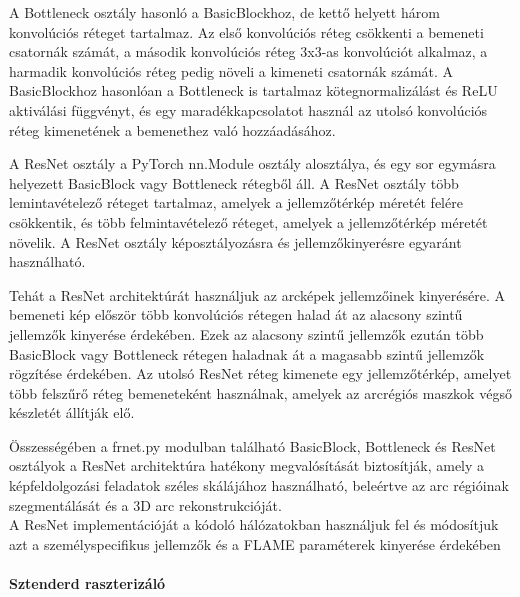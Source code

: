 \documentclass[12pt,a4]{article}
\begin{document}
            A Bottleneck osztály hasonló a BasicBlockhoz, de kettő helyett három konvolúciós réteget tartalmaz.
            Az első konvolúciós réteg csökkenti a bemeneti csatornák számát, a második konvolúciós réteg 3x3-as konvolúciót alkalmaz, a harmadik konvolúciós réteg pedig növeli a kimeneti csatornák számát.
            A BasicBlockhoz hasonlóan a Bottleneck is tartalmaz kötegnormalizálást és ReLU aktiválási függvényt, és egy maradékkapcsolatot használ az utolsó konvolúciós réteg kimenetének a bemenethez való hozzáadásához.
            
            A ResNet osztály a PyTorch nn.Module osztály alosztálya, és egy sor egymásra helyezett BasicBlock vagy Bottleneck rétegből áll.
            A ResNet osztály több lemintavételező réteget tartalmaz, amelyek a jellemzőtérkép méretét felére csökkentik, és több felmintavételező réteget, amelyek a jellemzőtérkép méretét növelik.
            A ResNet osztály képosztályozásra és jellemzőkinyerésre egyaránt használható.
             
            Tehát a ResNet architektúrát használjuk az arcképek jellemzőinek kinyerésére. A bemeneti kép először több konvolúciós rétegen halad át az alacsony szintű jellemzők kinyerése érdekében.
            Ezek az alacsony szintű jellemzők ezután több BasicBlock vagy Bottleneck rétegen haladnak át a magasabb szintű jellemzők rögzítése érdekében. 
            Az utolsó ResNet réteg kimenete egy jellemzőtérkép, amelyet több felszűrő réteg bemeneteként használnak, amelyek az arcrégiós maszkok végső készletét állítják elő.
            
            Összességében a frnet.py modulban található BasicBlock, Bottleneck és ResNet osztályok a ResNet architektúra hatékony megvalósítását biztosítják, 
            amely a képfeldolgozási feladatok széles skálájához használható, beleértve az arc régióinak szegmentálását és a 3D arc rekonstrukcióját. \\

            A ResNet implementációját a kódoló hálózatokban használjuk fel és módosítjuk azt a személyspecifikus jellemzők és a FLAME paraméterek kinyerése érdekében
                     
         \paragraph{Sztenderd raszterizáló}
\end{document}
